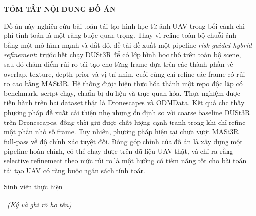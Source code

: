 \documentclass[../DoAn.tex]{subfiles}
\begin{document}
\begin{center}
    \Large{\textbf{TÓM TẮT NỘI DUNG ĐỒ ÁN}}\\
\end{center}
\vspace{1cm}

Đồ án này nghiên cứu bài toán tái tạo hình học từ ảnh UAV trong bối cảnh chi phí tính toán là một ràng buộc quan trọng. Thay vì refine toàn bộ chuỗi ảnh bằng một mô hình mạnh và đắt đỏ, đề tài đề xuất một pipeline \textit{risk-guided hybrid refinement}: trước hết chạy DUSt3R để có lớp hình học thô trên toàn bộ scene, sau đó chấm điểm rủi ro tái tạo cho từng frame dựa trên các thành phần về overlap, texture, depth prior và vị trí nhìn, cuối cùng chỉ refine các frame có rủi ro cao bằng MASt3R. Hệ thống được hiện thực hóa thành một repo độc lập có benchmark, script chạy, chuẩn bị dữ liệu và trực quan hóa. Thực nghiệm được tiến hành trên hai dataset thật là Dronescapes và ODMData. Kết quả cho thấy phương pháp đề xuất cải thiện nhẹ nhưng ổn định so với coarse baseline DUSt3R trên Dronescapes, đồng thời giữ được chất lượng cạnh tranh trong khi chỉ refine một phần nhỏ số frame. Tuy nhiên, phương pháp hiện tại chưa vượt MASt3R full-pass về độ chính xác tuyệt đối. Đóng góp chính của đồ án là xây dựng một pipeline hoàn chỉnh, có thể chạy được trên dữ liệu UAV thật, và chỉ ra rằng selective refinement theo mức rủi ro là một hướng có tiềm năng tốt cho bài toán tái tạo UAV có ràng buộc ngân sách tính toán.

\begin{flushright}
Sinh viên thực hiện\\
\begin{tabular}{@{}c@{}}
\textit{(Ký và ghi rõ họ tên)}
\end{tabular}
\end{flushright}
\end{document}
